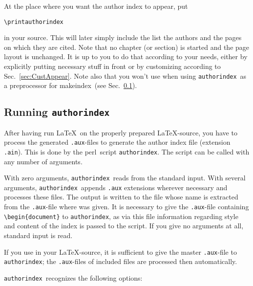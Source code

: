 \documentclass{article}
\newcommand{\mkindex}{\textsf{makeindex}}
\newcommand{\aiperl}{\texttt{authorindex}}
\newcommand{\perl}{\textsf{perl}}
\newcommand{\fnext}[1]{\texttt{.#1}}
\newcommand{\ltxinp}[1]{\texttt{\string#1}}
\begin{document}
At the place where you want the author index to appear, put
\begin{verbatim}
\printauthorindex
\end{verbatim}
in your source.  This will later simply include the list the authors and the
pages on which they are cited. Note that no chapter (or section) is started
and the page layout is unchanged. It is up to you to do that according to
your needs, either by explicitly putting necessary stuff in front or by
customizing according to Sec.~\ref{sec:CustAppear}. Note also that you won't
use \ltxinp{\printauthorindex} when using \aiperl\ as a preprocessor for
\mkindex\ (see Sec.~\ref{sec:Runai}).


\subsection{Running \aiperl}
\label{sec:Runai}

After having run \LaTeX\ on the properly prepared \LaTeX-source, you have to
process the generated \fnext{aux}-files to generate the author index file
(extension \fnext{ain}).  This is done by the \perl\ script \aiperl. The
script can be called with any number of arguments.

With zero arguments, \aiperl\ reads from the standard input. With several
arguments, \aiperl\ appends \fnext{aux} extensions wherever necessary and
processes these files. The output is written to the file whose name is
extracted from the \fnext{aux}-file where \ltxinp{\printauthorindex} was
given.  It is necessary to give the \fnext{aux}-file containing
\verb|\begin{document}| to \aiperl, as via this file information
regarding style and content of the index is passed to the script. If you
give no arguments at all, standard input is read.
  
If you use \ltxinp{} in your \LaTeX-source, it is sufficient to
give the master \fnext{aux}-file to \aiperl; the \fnext{aux}-files of
included files are processed then automatically.

\aiperl\ recognizes the following options:
\end{document}
